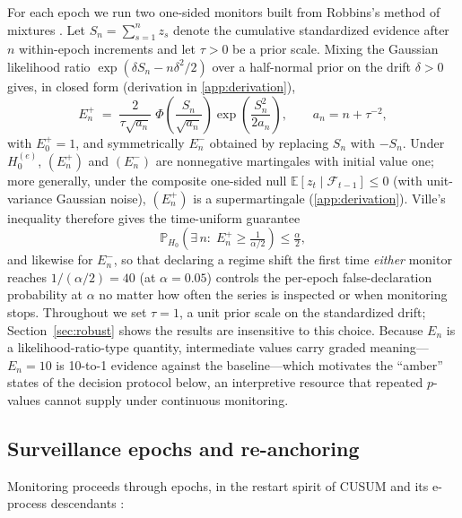\documentclass[review,authoryear,12pt]{elsarticle}
\newcommand{\E}{\mathbb{E}}
\newcommand{\Prob}{\mathbb{P}}
\begin{document}
For each epoch we run two one-sided monitors built from Robbins's method of mixtures \citep{robbins1970}. Let $S_n = \sum_{s=1}^{n} z_s$ denote the cumulative standardized evidence after $n$ within-epoch increments and let $\tau > 0$ be a prior scale. Mixing the Gaussian likelihood ratio $\exp(\delta S_n - n\delta^2/2)$ over a half-normal prior on the drift $\delta > 0$ gives, in closed form (derivation in \ref{app:derivation}),
\begin{equation}
E_n^{+} \;=\; \frac{2}{\tau\sqrt{a_n}}\;\Phi\!\left(\frac{S_n}{\sqrt{a_n}}\right)\exp\!\left(\frac{S_n^2}{2 a_n}\right),
\qquad a_n = n + \tau^{-2},
\label{eq:evalue}
\end{equation}
with $E_0^{+} = 1$, and symmetrically $E_n^{-}$ obtained by replacing $S_n$ with $-S_n$. Under $H_0^{(e)}$, $(E_n^{+})$ and $(E_n^{-})$ are nonnegative martingales with initial value one; more generally, under the composite one-sided null $\E[z_t \mid \mathcal{F}_{t-1}] \le 0$ (with unit-variance Gaussian noise), $(E_n^{+})$ is a supermartingale (\ref{app:derivation}). Ville's inequality therefore gives the time-uniform guarantee
\begin{equation}
\Prob_{H_0}\!\left(\exists\, n:\; E_n^{+} \ge \tfrac{1}{\alpha/2}\right) \le \tfrac{\alpha}{2},
\label{eq:ville}
\end{equation}
and likewise for $E_n^{-}$, so that declaring a regime shift the first time \emph{either} monitor reaches $1/(\alpha/2) = 40$ (at $\alpha = 0.05$) controls the per-epoch false-declaration probability at $\alpha$ no matter how often the series is inspected or when monitoring stops. Throughout we set $\tau = 1$, a unit prior scale on the standardized drift; Section~\ref{sec:robust} shows the results are insensitive to this choice. Because $E_n$ is a likelihood-ratio-type quantity, intermediate values carry graded meaning---$E_n = 10$ is 10-to-1 evidence against the baseline---which motivates the ``amber'' states of the decision protocol below, an interpretive resource that repeated $p$-values cannot supply under continuous monitoring.

\subsection{Surveillance epochs and re-anchoring}
\label{sec:epochs}

Monitoring proceeds through epochs, in the restart spirit of CUSUM \citep{page1954} and its e-process descendants \citep{shin2023}:
\end{document}
